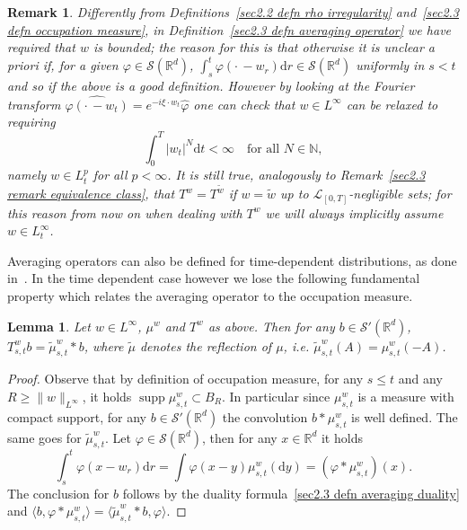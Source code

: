 \documentclass[10pt]{article}
\newcommand{\mathd}{\mathrm{d}}
\newcommand{\tmop}[1]{\ensuremath{\operatorname{#1}}}
\newtheorem{lemma}[theorem]{Lemma}
\newtheorem{remark}[theorem]{Remark}
\begin{document}
\begin{remark}
  Differently from Definitions~\ref{sec2.2 defn rho irregularity}
  and~\ref{sec2.3 defn occupation measure}, in Definition~\ref{sec2.3 defn
  averaging operator} we have required that $w$ is bounded; the reason for
  this is that otherwise it is unclear a priori if, for a given $\varphi \in
  \mathcal{S} (\mathbb{R}^d)$, $\int_s^t \varphi \left( \cdot \, - w_r \right)
  \mathd r \in \mathcal{S} (\mathbb{R}^d)$ uniformly in $s < t$ and so if the
  above is a good definition. However by looking at the Fourier transform
  $\widehat{\varphi \left( \cdot \, - w_t \right)} = e^{- i \xi \cdot w_t} 
  \hat{\varphi}$ one can check that $w \in L^{\infty}$ can be relaxed to
  requiring
  \[ \int_0^T | w_t |^N \mathd t < \infty \quad \text{for all } N \in
     \mathbb{N}, \]
  namely $w \in L^p_t$ for all $p < \infty$. It is still true, analogously to
  Remark~\ref{sec2.3 remark equivalence class}, that $T^w = T^{\tilde{w}}$ if
  $w = \tilde{w}$ up to $\mathcal{L}_{[0, T]}$\mbox{-}negligible sets; for
  this reason from now on when dealing with $T^w$ we will always implicitly
  assume $w \in L^{\infty}_t$.
\end{remark}

Averaging operators can also be defined for time\mbox{-}dependent
distributions, as done in~{\cite{galeatigubinelli_ode}}. In the time dependent
case however we lose the following fundamental property which relates the
averaging operator to the occupation measure.

\begin{lemma}
  \label{sec2.3 lemma averaging occupation}Let $w \in L^{\infty}$, $\mu^w$ and
  $T^w$ as above. Then for any $b \in \mathcal{S}' (\mathbb{R}^d)$, $T^w_{s,
  t} b = \tilde{\mu}^w_{s, t} \ast b$, where $\tilde{\mu}$ denotes the
  reflection of $\mu$, i.e. $\tilde{\mu}^w_{s, t} (A) = \mu^w_{s, t} (- A)$.
\end{lemma}

\begin{proof}
  Observe that by definition of occupation measure, for any $s \leqslant t$
  and any $R \geqslant \| w \|_{L^{\infty}}$, it holds $\tmop{supp} \mu^w_{s,
  t} \subset B_R$. In particular since $\mu^w_{s, t}$ is a measure with
  compact support, for any $b \in \mathcal{S}' (\mathbb{R}^d)$ the convolution
  $b \ast \mu^w_{s, t}$ is well defined. The same goes for $\tilde{\mu}^w_{s,
  t}$. Let $\varphi \in \mathcal{S} (\mathbb{R}^d)$, then for any $x \in
  \mathbb{R}^d$ it holds
  \[ \int_s^t \varphi (x - w_r) \mathd r = \int \varphi (x - y) \mu^w_{s, t}
     (\mathd y) = (\varphi \ast \mu^w_{s, t}) (x) . \]
  The conclusion for $b$ follows by the duality formula~\eqref{sec2.3 defn
  averaging duality} and $\langle b, \varphi \ast \mu^w_{s, t} \rangle =
  \langle \tilde{\mu}_{s, t}^w \ast b, \varphi \rangle$.
\end{proof}
\end{document}
